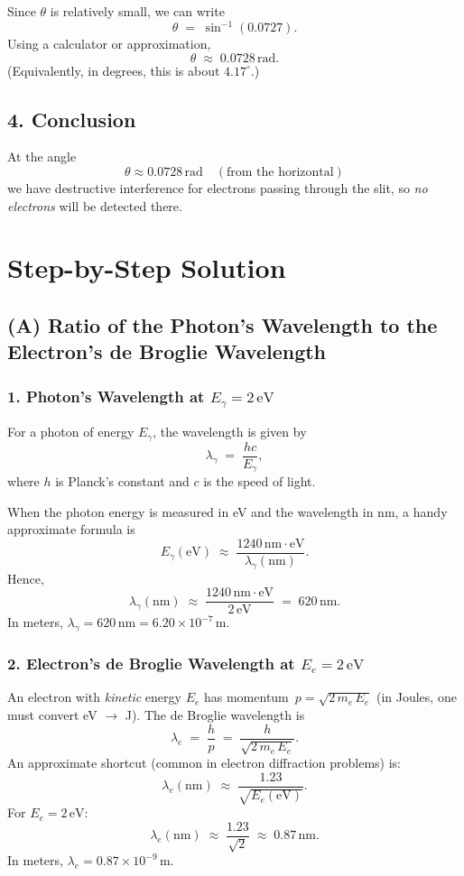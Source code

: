 \documentclass[12pt]{article}
\theoremstyle{definition} %
\theoremstyle{plain} %
\begin{document}
Since $\theta$ is relatively small, we can write
\[
\theta \;=\; \sin^{-1}(0.0727).
\]
Using a calculator or approximation, 
\[
\theta \;\approx\; 0.0728\,\text{rad}.
\]
(Equivalently, in degrees, this is about $4.17^\circ$.)

\subsection*{4. Conclusion}

At the angle
\[
\boxed{\theta \approx 0.0728\,\text{rad}
\quad
(\text{from the horizontal})}
\]
we have destructive interference for electrons passing through the slit, 
so \emph{no electrons} will be detected there.

\section*{Step-by-Step Solution}

\subsection*{(A) Ratio of the Photon's Wavelength to the Electron's de Broglie Wavelength}

\subsubsection*{1. Photon's Wavelength at \(E_{\gamma} = 2\,\text{eV}\)}

For a photon of energy \(E_{\gamma}\), the wavelength is given by
\[
\lambda_{\gamma} \;=\; \frac{hc}{E_{\gamma}},
\]
where \(h\) is Planck's constant and \(c\) is the speed of light. 

When the photon energy is measured in eV and the wavelength in nm, a handy approximate formula is
\[
E_{\gamma}(\text{eV}) 
\;\approx\; \frac{1240\,\text{nm}\cdot\text{eV}}{\lambda_{\gamma}(\text{nm})}.
\]
Hence,
\[
\lambda_{\gamma}(\text{nm})
\;\approx\; 
\frac{1240\,\text{nm}\cdot\text{eV}}{2\,\text{eV}}
\;=\;
620\,\text{nm}.
\]
In meters, \(\lambda_{\gamma} = 620\,\text{nm} = 6.20\times10^{-7}\,\text{m}.\)

\subsubsection*{2. Electron's de Broglie Wavelength at \(E_{e} = 2\,\text{eV}\)}

An electron with \emph{kinetic} energy \(E_{e}\) has momentum 
\(\,p = \sqrt{2\,m_e\,E_{e}}\) (in Joules, one must convert eV \(\to\) J). 
The de Broglie wavelength is
\[
\lambda_{e} 
\;=\; \frac{h}{p}
\;=\; \frac{h}{\sqrt{2\,m_e\,E_{e}}}.
\]
An approximate shortcut (common in electron diffraction problems) is:
\[
\lambda_{e}(\text{nm})
\;\approx\; \frac{1.23}{\sqrt{E_{e}(\text{eV})}}.
\]
For \(E_{e}=2\,\text{eV}\):
\[
\lambda_{e}(\text{nm})
\;\approx\; \frac{1.23}{\sqrt{2}}
\;\approx\; 0.87\,\text{nm}.
\]
In meters, \(\lambda_{e} = 0.87\times10^{-9}\,\text{m}.\)
\end{document}
